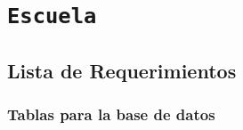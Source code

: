\section{\texttt{Escuela}}

\subsection{Lista de Requerimientos}

\subsubsection*{Tablas para la base de datos}

